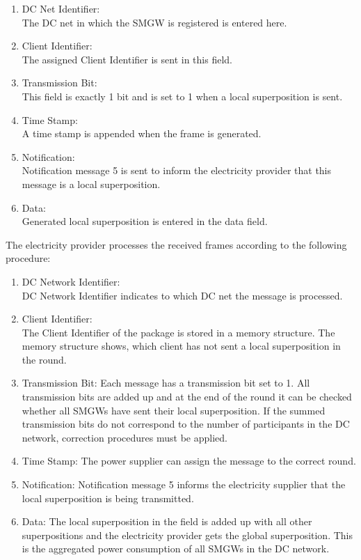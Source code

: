 \begin{enumerate}
\item DC Net Identifier:\\
The DC net in which the \gls{SMGW} is registered is entered here.
\item Client Identifier:\\ 
The assigned Client Identifier is sent in this field.
\item Transmission Bit:\\
This field is exactly 1 bit and is set to 1 when a local superposition is sent.
\item Time Stamp:\\
A time stamp is appended when the frame is generated.
\item Notification:\\
Notification message 5 is sent to inform the electricity provider that this message is a local superposition.
\item Data:\\
Generated local superposition is entered in the data field.
\end{enumerate}
The electricity provider processes the received frames according to the following procedure:\\
\begin{enumerate}
\item DC Network Identifier:\\
DC Network Identifier indicates to which DC net the message is processed.
\item Client Identifier:\\
The Client Identifier of the package is stored in a memory structure. The memory structure shows, which client has not sent a local superposition in the round.
\item Transmission Bit: Each message has a transmission bit set to 1. All transmission bits are added up and at the end of the round it can be checked whether all \gls{SMGW}s have sent their local superposition. If the summed transmission bits do not correspond to the number of participants in the DC network, correction procedures must be applied.
\item Time Stamp: The power supplier can assign the message to the correct round.
\item Notification: Notification message 5 informs the electricity supplier that the local superposition is being transmitted.
\item Data:
The local superposition in the field is added up with all other superpositions and the electricity provider gets the global superposition. This is the aggregated power consumption of all \gls{SMGW}s in the DC network.
\end{enumerate}
